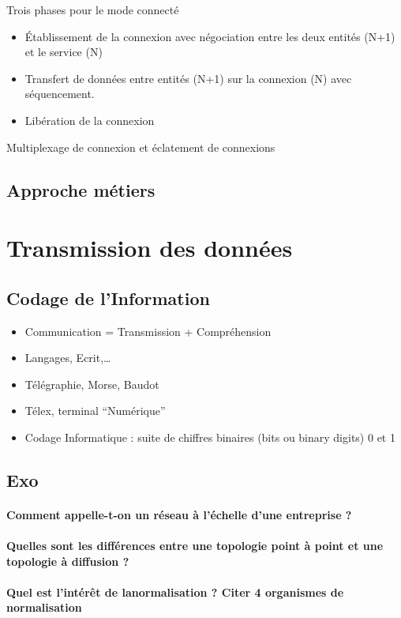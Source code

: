\documentclass[12pt,a4paper,openany]{book}
\begin{document}
Trois phases pour le mode connecté
\begin{itemize}
	\item \'Etablissement de la connexion avec négociation entre les deux entités (N+1) et le service (N)
	\item Transfert de données entre entités (N+1) sur la connexion (N) avec séquencement.
	\item Libération de la connexion
\end{itemize}
Multiplexage de connexion et éclatement de connexions
	\chapter{Approche métiers}

	\part{Transmission des données}
	\chapter{Codage de l'Information}
	\begin{itemize}
		\item Communication = Transmission + Compréhension
		\item Langages, Ecrit,\ldots
		\item Télégraphie, Morse, Baudot
		\item Télex, terminal ``Numérique''
		\item Codage Informatique : suite de chiffres binaires (bits ou binary digits) 0 et 1
	\end{itemize}
	\appendix
	\chapter{Exo}
	\subsection{Comment appelle-t-on un réseau à l'échelle d'une entreprise ?}
	\subsection{Quelles sont les différences entre une topologie point à point et une topologie à diffusion ?}
	\subsection{Quel est l'intérêt de lanormalisation ? Citer 4 organismes de normalisation}
\end{document}
